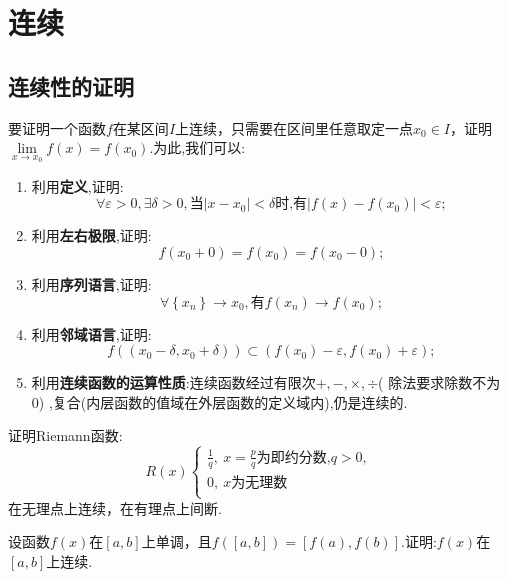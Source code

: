 \chapter{连续}

\section{连续性的证明}

要证明一个函数$f$在某区间$I$上连续，只需要在区间里任意取定一点$x_0\in I$，证明$\lim\limits_{x\rightarrow x_0}f\left( x \right) =f\left( x_0 \right) $.为此,我们可以:

\begin{enumerate}
	\item 利用\textbf{定义},证明:
	      $$
		      \forall \varepsilon >0,\exists \delta >0,\text{当}\left| x-x_0 \right|<\delta \text{时,有}\left| f\left( x \right) -f\left( x_0 \right) \right|<\varepsilon ;
	      $$
	\item 利用\textbf{左右极限},证明:
	      $$f\left( x_0+0 \right) =f\left( x_0 \right) =f\left( x_0-0 \right) ;$$
	\item 利用\textbf{序列语言},证明:
	      $$\forall \left\{ x_n \right\} \rightarrow x_0,\text{有}f\left( x_n \right) \rightarrow f\left( x_0 \right) ;$$
	\item 利用\textbf{邻域语言},证明:
	      $$
		      f\left( \left( x_0-\delta ,x_0+\delta \right) \right) \subset \left( f\left( x_0 \right) -\varepsilon ,f\left( x_0 \right) +\varepsilon \right) ;
	      $$
	\item 利用\textbf{连续函数的运算性质}:连续函数经过有限次$+,-,\times ,\div $( 除法要求除数不为0) ,复合(内层函数的值域在外层函数的定义域内),仍是连续的.
\end{enumerate}

\begin{example}
	证明Riemann函数:
	$$
		R\left( x \right) \left\{ \begin{array}{l}
			\frac{1}{q},\ x=\frac{p}{q}\text{为即约分数,}q>0, \\
			0,\ x\text{为无理数}                             \\
		\end{array} \right.
	$$
	在无理点上连续，在有理点上间断.
\end{example}

\vspace{6cm}

\begin{example}
	设函数$f\left( x \right) $在$\left[ a,b \right] $上单调，且$f\left( \left[ a,b \right] \right) =\left[ f\left( a \right) ,f\left( b \right) \right]$.证明:$f\left( x \right) $在$\left[ a,b \right] $上连续.
\end{example}

